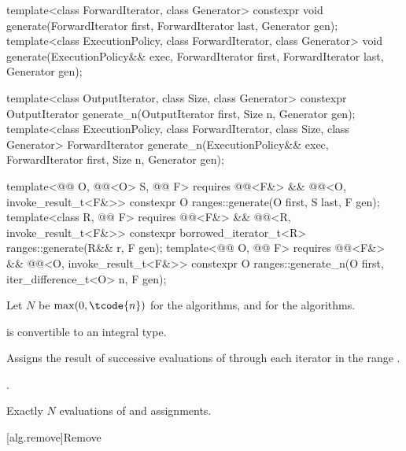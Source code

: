 %
%
\begin{itemdecl}
template<class ForwardIterator, class Generator>
  constexpr void generate(ForwardIterator first, ForwardIterator last,
                          Generator gen);
template<class ExecutionPolicy, class ForwardIterator, class Generator>
  void generate(ExecutionPolicy&& exec,
                ForwardIterator first, ForwardIterator last,
                Generator gen);

template<class OutputIterator, class Size, class Generator>
  constexpr OutputIterator generate_n(OutputIterator first, Size n, Generator gen);
template<class ExecutionPolicy, class ForwardIterator, class Size, class Generator>
  ForwardIterator generate_n(ExecutionPolicy&& exec,
                             ForwardIterator first, Size n, Generator gen);

template<@@ O, @@<O> S, @@ F>
  requires @@<F&> && @@<O, invoke_result_t<F&>>
  constexpr O ranges::generate(O first, S last, F gen);
template<class R, @@ F>
  requires @@<F&> && @@<R, invoke_result_t<F&>>
  constexpr borrowed_iterator_t<R> ranges::generate(R&& r, F gen);
template<@@ O, @@ F>
  requires @@<F&> && @@<O, invoke_result_t<F&>>
  constexpr O ranges::generate_n(O first, iter_difference_t<O> n, F gen);
\end{itemdecl}

\begin{itemdescr}
\pnum
Let $N$ be $\max(0, \tcode{n})$ for the  algorithms, and
 for the  algorithms.

\pnum
\mandates
{} is convertible
to an integral type.

\pnum
\effects
Assigns the result of successive evaluations of 
through each iterator in the range .

\pnum
\returns
{}.

\pnum
\complexity
Exactly $N$ evaluations of  and assignments.
\end{itemdescr}

[alg.remove]{Remove}

